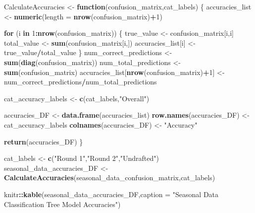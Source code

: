 \documentclass[
]{article}
\newenvironment{Shaded}{\begin{snugshade}}{\end{snugshade}}
\newcommand{\AttributeTok}[1]{\textcolor[rgb]{0.13,0.29,0.53}{#1}}
\newcommand{\ControlFlowTok}[1]{\textcolor[rgb]{0.13,0.29,0.53}{\textbf{#1}}}
\newcommand{\DecValTok}[1]{\textcolor[rgb]{0.00,0.00,0.81}{#1}}
\newcommand{\FunctionTok}[1]{\textcolor[rgb]{0.13,0.29,0.53}{\textbf{#1}}}
\newcommand{\NormalTok}[1]{#1}
\newcommand{\OtherTok}[1]{\textcolor[rgb]{0.56,0.35,0.01}{#1}}
\newcommand{\SpecialCharTok}[1]{\textcolor[rgb]{0.81,0.36,0.00}{\textbf{#1}}}
\newcommand{\StringTok}[1]{\textcolor[rgb]{0.31,0.60,0.02}{#1}}
\begin{document}
\begin{Shaded}
\begin{Highlighting}[]
\NormalTok{CalculateAccuracies }\OtherTok{\textless{}{-}} \ControlFlowTok{function}\NormalTok{(confusion\_matrix,cat\_labels) \{}
\NormalTok{  accuracies\_list }\OtherTok{\textless{}{-}} \FunctionTok{numeric}\NormalTok{(}\AttributeTok{length =} \FunctionTok{nrow}\NormalTok{(confusion\_matrix)}\SpecialCharTok{+}\DecValTok{1}\NormalTok{)}
  
  \ControlFlowTok{for}\NormalTok{ (i }\ControlFlowTok{in} \DecValTok{1}\SpecialCharTok{:}\FunctionTok{nrow}\NormalTok{(confusion\_matrix)) \{}
\NormalTok{    true\_value }\OtherTok{\textless{}{-}}\NormalTok{ confusion\_matrix[i,i]}
\NormalTok{    total\_value }\OtherTok{\textless{}{-}} \FunctionTok{sum}\NormalTok{(confusion\_matrix[i,])}
\NormalTok{    accuracies\_list[i] }\OtherTok{\textless{}{-}}\NormalTok{ true\_value}\SpecialCharTok{/}\NormalTok{total\_value}
\NormalTok{  \}}
\NormalTok{  num\_correct\_predictions }\OtherTok{\textless{}{-}} \FunctionTok{sum}\NormalTok{(}\FunctionTok{diag}\NormalTok{(confusion\_matrix))}
\NormalTok{  num\_total\_predictions }\OtherTok{\textless{}{-}} \FunctionTok{sum}\NormalTok{(confusion\_matrix)}
\NormalTok{  accuracies\_list[}\FunctionTok{nrow}\NormalTok{(confusion\_matrix)}\SpecialCharTok{+}\DecValTok{1}\NormalTok{] }\OtherTok{\textless{}{-}} 
\NormalTok{    num\_correct\_predictions}\SpecialCharTok{/}\NormalTok{num\_total\_predictions}
  
\NormalTok{  cat\_accuracy\_labels }\OtherTok{\textless{}{-}} \FunctionTok{c}\NormalTok{(cat\_labels,}\StringTok{"Overall"}\NormalTok{)}
  
\NormalTok{  accuracies\_DF }\OtherTok{\textless{}{-}} \FunctionTok{data.frame}\NormalTok{(accuracies\_list)}
  \FunctionTok{row.names}\NormalTok{(accuracies\_DF) }\OtherTok{\textless{}{-}}\NormalTok{ cat\_accuracy\_labels}
  \FunctionTok{colnames}\NormalTok{(accuracies\_DF) }\OtherTok{\textless{}{-}} \StringTok{"Accuracy"}
  
  \FunctionTok{return}\NormalTok{(accuracies\_DF)}
\NormalTok{\}}

\NormalTok{cat\_labels }\OtherTok{\textless{}{-}} \FunctionTok{c}\NormalTok{(}\StringTok{"Round 1"}\NormalTok{,}\StringTok{"Round 2"}\NormalTok{,}\StringTok{"Undrafted"}\NormalTok{)}
\NormalTok{seasonal\_data\_accuracies\_DF }\OtherTok{\textless{}{-}} 
  \FunctionTok{CalculateAccuracies}\NormalTok{(seasonal\_data\_confusion\_matrix,cat\_labels)}

\NormalTok{knitr}\SpecialCharTok{::}\FunctionTok{kable}\NormalTok{(seasonal\_data\_accuracies\_DF,}\AttributeTok{caption =} 
  \StringTok{"Seasonal Data Classification Tree Model Accuracies"}\NormalTok{)}
\end{Highlighting}
\end{Shaded}
\end{document}
